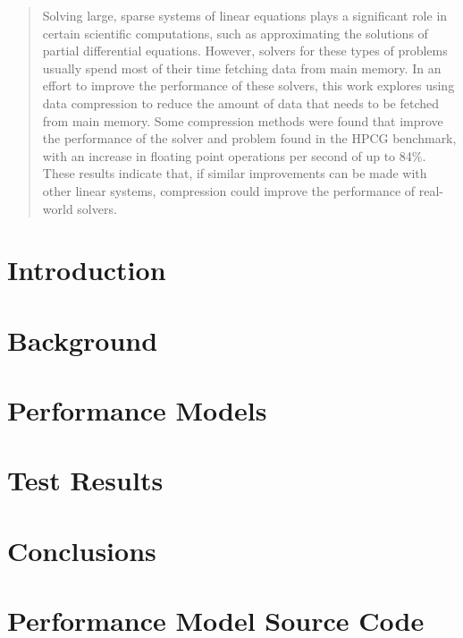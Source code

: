 \documentclass[]{csbsjuthesis}
\title{}
\author{Neil Lindquist}
\date{April 2019}
\begin{document}
\theoremstyle{definition}
\newtheorem{example}{Example}

\begin{abstract}
	Solving large, sparse systems of linear equations plays a significant role in certain scientific computations, such as approximating the solutions of partial differential equations.
	However, solvers for these types of problems usually spend most of their time fetching data from main memory.
	In an effort to improve the performance of these solvers, this work explores using data compression to reduce the amount of data that needs to be fetched from main memory.
	Some compression methods were found that improve the performance of the solver and problem found in the HPCG benchmark, with an increase in floating point operations per second of up to 84\%.
	These results indicate that, if similar improvements can be made with other linear systems, compression could improve the performance of real-world solvers.
\end{abstract}

\maketitle

\section{Introduction}


\section{Background}


\section{Performance Models}


\section{Test Results}
\label{sec:results}


\section{Conclusions}




\appendix

\section{Performance Model Source Code}
\label{app:decode-model-source}

 
\end{document}
